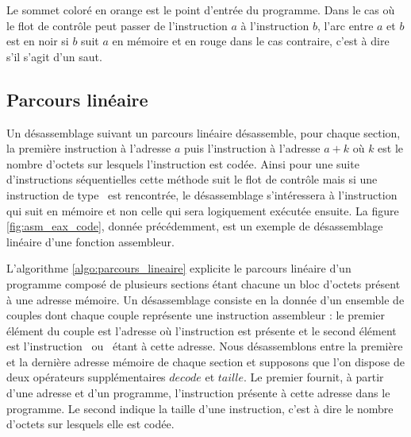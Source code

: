 Le sommet coloré en orange est le point d'entrée du programme. Dans le cas où le flot de contrôle peut passer de l'instruction $a$ à l'instruction $b$, l'arc entre $a$ et $b$ est en noir si $b$ suit $a$ en mémoire et en rouge dans le cas contraire, c'est à dire s'il s'agit d'un saut.

\FloatBarrier
\subsection{Parcours linéaire}
Un désassemblage suivant un parcours linéaire désassemble, pour chaque section, la première instruction à l'adresse $a$ puis l'instruction à l'adresse $a+k$ où $k$ est le nombre d'octets sur lesquels l'instruction est codée.
Ainsi pour une suite d'instructions séquentielles cette méthode suit le flot de contrôle mais si une instruction de type \jmp\ est rencontrée, le désassemblage s'intéressera à l'instruction qui suit en mémoire et non celle qui sera logiquement exécutée ensuite.
La figure \ref{fig:asm_eax_code}, donnée précédemment, est un exemple de désassemblage linéaire d'une fonction assembleur.

L'algorithme \ref{algo:parcours_lineaire} explicite le parcours linéaire d'un programme composé de plusieurs sections étant chacune un bloc d'octets présent à une adresse mémoire.
Un désassemblage consiste en la donnée d'un ensemble de couples dont chaque couple représente une instruction assembleur : le premier élément du couple est l'adresse où l'instruction est présente et le second élément est l'instruction \xq\ ou \xs\ étant à cette adresse.
Nous désassemblons entre la première et la dernière adresse mémoire de chaque section et supposons que l'on dispose de deux opérateurs supplémentaires $decode$ et $taille$.
Le premier fournit, à partir d'une adresse et d'un programme, l'instruction présente à cette adresse dans le programme.
Le second indique la taille d'une instruction, c'est à dire le nombre d'octets sur lesquels elle est codée.

